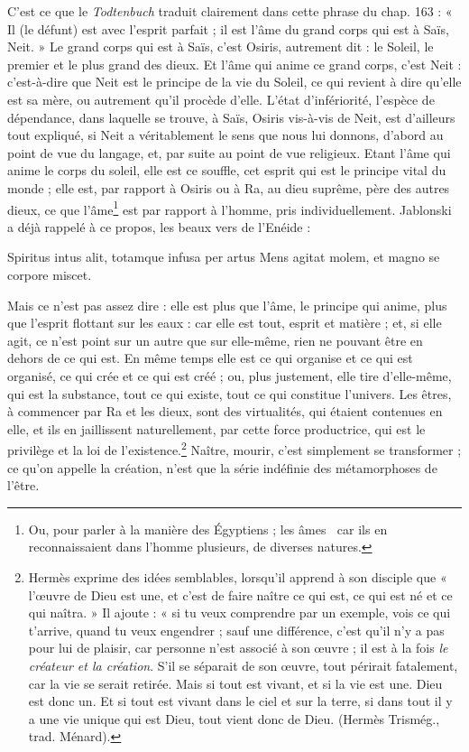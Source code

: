 \documentclass[letterpaper,twocolumn,openany,nodeprecatedcode]{dndbook}
\newcommand*\hieroAAEF{}
\newcommand*\hieroABFX{}
\begin{document}
C'est ce que le \emph{Todtenbuch} traduit clairement dans cette phrase du chap. 163 : « Il (le défunt) est avec l'esprit parfait ; il est l'âme du grand corps qui est à Saïs, Neit. » Le grand corps qui est à Saïs, c'est Osiris, autrement dit : le Soleil, le premier et le plus grand des dieux. Et l'âme qui anime ce grand corps, c'est Neit : c'est-à-dire que Neit est le principe de la vie du Soleil, ce qui revient à dire qu'elle est sa mère, ou autrement qu'il procède d'elle. L'état d'infériorité, l'espèce de dépendance, dans laquelle se trouve, à Saïs, Osiris vis-à-vis de Neit, est d'ailleurs tout expliqué, si Neit a véritablement le sens que nous lui donnons, d'abord au point de vue du langage, et, par suite au point de vue religieux. Etant l'âme qui anime le corps du soleil, elle est ce souffle, cet esprit qui est le principe vital du monde ; elle est, par rapport à Osiris ou à Ra, au dieu suprême, père des autres dieux, ce que l'âme\footnote{Ou, pour parler à la manière des Égyptiens ; les âmes $\hieroABFX\:\hieroAAEF$ car ils en reconnaissaient dans l'homme plusieurs, de diverses natures.} est par rapport à l'homme, pris individuellement. Jablonski a déjà rappelé à ce propos, les beaux vers de l'Enéide :

Spiritus intus alit, totamque infusa per artus Mens agitat molem, et magno se corpore miscet.

Mais ce n'est pas assez dire : elle est plus que l'âme, le principe qui anime, plus que l'esprit flottant sur les eaux : car elle est tout, esprit et matière ; et, si elle agit, ce n'est point sur un autre que sur elle-même, rien ne pouvant être en dehors de ce qui est. En même temps elle est ce qui organise et ce qui est organisé, ce qui crée et ce qui est créé ; ou, plus justement, elle tire d'elle-même, qui est la substance, tout ce qui existe, tout ce qui constitue l'univers. Les êtres, à commencer par Ra et les dieux, sont des virtualités, qui étaient contenues en elle, et ils en jaillissent naturellement, par cette force productrice, qui est le privilège et la loi de l'existence.\footnote{Hermès exprime des idées semblables, lorsqu'il apprend à son disciple que « l'œuvre de Dieu est une, et c'est de faire naître ce qui est, ce qui est né et ce qui naîtra. » Il ajoute : « si tu veux comprendre par un exemple, vois ce qui t'arrive, quand tu veux engendrer ; sauf une différence, c'est qu'il n'y a pas pour lui de plaisir, car personne n'est associé à son œuvre ; il est à la fois \emph{le créateur et la création}. S'il se séparait de son œuvre, tout périrait fatalement, car la vie se serait retirée. Mais si tout est vivant, et si la vie est une. Dieu est donc un. Et si tout est vivant dans le ciel et sur la terre, si dans tout il y a une vie unique qui est Dieu, tout vient donc de Dieu. (Hermès Trismég., trad. Ménard).} Naître, mourir, c'est simplement se transformer ; ce qu'on appelle la création, n'est que la série indéfinie des métamorphoses de l'être.
\end{document}
